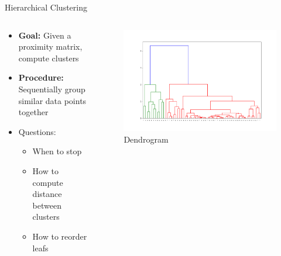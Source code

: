 \documentclass[shortpres]{beamer}
\begin{document}
\begin{frame}{Hierarchical Clustering}

\begin{columns}
\begin{column}{0.6\textwidth}
\begin{itemize}
\item \textbf{Goal:} Given a proximity matrix, compute clusters
\item \textbf{Procedure:} Sequentially group similar data points together
\item Questions:
\begin{itemize}
\item When to stop
\item How to compute distance between clusters
\item How to reorder leafs
\end{itemize}
\end{itemize}
\end{column}
\begin{column}{0.4\textwidth}
\begin{figure}[h!]
	\vspace{-1em}
  \centering
    \includegraphics[width=\textwidth]{dendro.png}
  \vspace{-2em}
  \caption{Dendrogram}
\end{figure}
\end{column}
\end{columns}

\end{frame}
\end{document}
